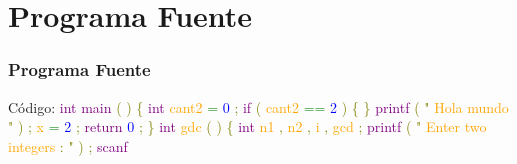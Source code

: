 \documentclass{beamer}
\begin{document}
\section{Programa Fuente}\begin{frame}[allowframebreaks] 
\frametitle{Programa Fuente} 
Código:
\newline 
\newline 
\newline 
\textcolor{purple}{ int } 
\textcolor{purple}{ main } 
\textcolor{olive}{ ( } 
\textcolor{olive}{ ) } 
\newline 
\textcolor{olive}{ \{ } 
\textcolor{purple}{ int } 
\textcolor{orange}{ cant2 } 
\textcolor{green}{ = } 
\textcolor{blue}{ 0 } 
\textcolor{olive}{ ; } 
\newline 
\textcolor{purple}{ if } 
\textcolor{olive}{ ( } 
\textcolor{orange}{ cant2 } 
\textcolor{green}{ == } 
\textcolor{blue}{ 2 } 
\textcolor{olive}{ ) } 
\textcolor{olive}{ \{ } 
\textcolor{olive}{\} } 
\newline 
\textcolor{purple}{ printf } 
\textcolor{olive}{ ( } 
\textcolor{olive}{ " } 
\textcolor{orange}{ Hola } 
\textcolor{orange}{ mundo } 
\textcolor{olive}{ " } 
\textcolor{olive}{ ) } 
\textcolor{olive}{ ; } 
\newline 
\textcolor{orange}{ x } 
\textcolor{green}{ = } 
\textcolor{blue}{ 2 } 
\textcolor{olive}{ ; } 
\newline 
\textcolor{purple}{ return } 
\textcolor{blue}{ 0 } 
\textcolor{olive}{ ; } 
\newline 
\textcolor{olive}{\} } 
\newline 
\newline 
\textcolor{purple}{ int } 
\textcolor{orange}{ gdc } 
\textcolor{olive}{ ( } 
\textcolor{olive}{ ) } 
\newline 
\textcolor{olive}{ \{ } 
\newline 
\textcolor{purple}{ int } 
\textcolor{orange}{ n1 } 
\textcolor{olive}{ , } 
\textcolor{orange}{ n2 } 
\textcolor{olive}{ , } 
\textcolor{orange}{ i } 
\textcolor{olive}{ , } 
\textcolor{orange}{ gcd } 
\textcolor{olive}{ ; } 
\newline 
\newline 
\textcolor{purple}{ printf } 
\textcolor{olive}{ ( } 
\textcolor{olive}{ " } 
\textcolor{orange}{ Enter } 
\textcolor{orange}{ two } 
\textcolor{orange}{ integers } 
\textcolor{olive}{ : } 
\textcolor{olive}{ " } 
\textcolor{olive}{ ) } 
\textcolor{olive}{ ; } 
\newline 
\textcolor{purple}{ scanf } 

\end{frame}
\end{document}
